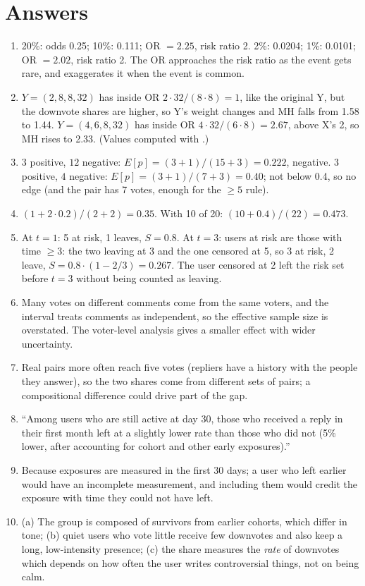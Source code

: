 \section*{Answers}
\begin{enumerate}
  \item 20\%: odds 0.25; 10\%: 0.111; OR $=2.25$, risk ratio 2. 2\%: 0.0204; 1\%: 0.0101; OR $=2.02$, risk ratio 2. The OR approaches the risk ratio as the event gets rare, and exaggerates it when the event is common.
  \item $Y=(2,8,8,32)$ has inside OR $2\cdot32/(8\cdot8)=1$, like the original Y, but the downvote shares are higher, so Y's weight changes and MH falls from 1.58 to 1.44. $Y=(4,6,8,32)$ has inside OR $4\cdot32/(6\cdot8)=2.67$, above X's 2, so MH rises to 2.33. (Values computed with .)
  \item $3$ positive, $12$ negative: $E[p]=(3+1)/(15+3)=0.222$, negative. $3$ positive, $4$ negative: $E[p]=(3+1)/(7+3)=0.40$; not below 0.4, so no edge (and the pair has 7 votes, enough for the $\ge5$ rule).
  \item $(1+2\cdot0.2)/(2+2)=0.35$. With 10 of 20: $(10+0.4)/(22)=0.473$.
  \item At $t=1$: 5 at risk, 1 leaves, $S=0.8$. At $t=3$: users at risk are those with time $\ge3$: the two leaving at 3 and the one censored at 5, so 3 at risk, 2 leave, $S=0.8\cdot(1-2/3)=0.267$. The user censored at 2 left the risk set before $t=3$ without being counted as leaving.
  \item Many votes on different comments come from the same voters, and the interval treats comments as independent, so the effective sample size is overstated. The voter-level analysis gives a smaller effect with wider uncertainty.
  \item Real pairs more often reach five votes (repliers have a history with the people they answer), so the two shares come from different sets of pairs; a compositional difference could drive part of the gap.
  \item ``Among users who are still active at day 30, those who received a reply in their first month left at a slightly lower rate than those who did not (5\% lower, after accounting for cohort and other early exposures).''
  \item Because exposures are measured in the first 30 days; a user who left earlier would have an incomplete measurement, and including them would credit the exposure with time they could not have left.
  \item (a) The group is composed of survivors from earlier cohorts, which differ in tone; (b) quiet users who vote little receive few downvotes and also keep a long, low-intensity presence; (c) the share measures the \emph{rate} of downvotes which depends on how often the user writes controversial things, not on being calm.
\end{enumerate}
